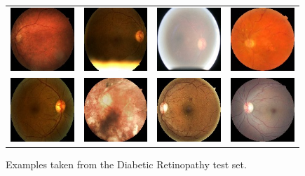 \documentclass[preprint]{elsarticle}
\begin{document}
\begin{figure}[!t]
	\centering
	\begin{tabular}{cccc}
		\includegraphics[width=2.4cm]{img/retinopathy/1.jpg} & \includegraphics[width=2.4cm]{img/retinopathy/2.jpg} & \includegraphics[width=2.4cm]{img/retinopathy/3.jpg} & \includegraphics[width=2.4cm]{img/retinopathy/4.jpg}\\
		\includegraphics[width=2.4cm]{img/retinopathy/5.jpg} & \includegraphics[width=2.4cm]{img/retinopathy/6.jpg} & \includegraphics[width=2.4cm]{img/retinopathy/7.jpg} & \includegraphics[width=2.4cm]{img/retinopathy/8.jpg}
	\end{tabular}						
	\caption{Examples taken from the Diabetic Retinopathy test set.}
	\label{fig:DRexamples}
\end{figure}
\end{document}
